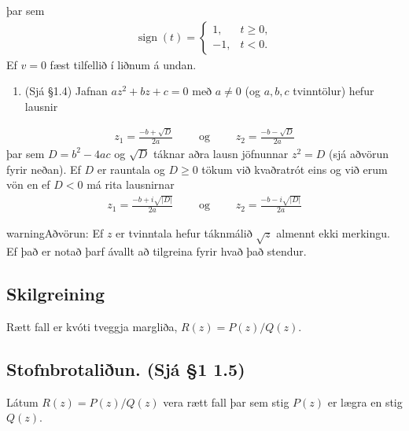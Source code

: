 \documentclass[a4paper,10pt,icelandic]{sphinxmanual}
\begin{document}
þar sem
\begin{equation*}
\begin{split}{{\operatorname{sign}}}(t)=
 \begin{cases}
 1, &t\geq 0,\\
 -1,&t<0.
 \end{cases}\end{split}
\end{equation*}
Ef \(v=0\) fæst tilfellið í liðnum á undan.
\begin{enumerate}
%
\setcounter{enumi}{3}
\item {} 
(Sjá \S{}1.4)  Jafnan \(az^2+bz+c=0\) með \(a\neq 0\) (og \(a, b, c\) tvinntölur) hefur lausnir

\end{enumerate}
\begin{equation*}
\begin{split}z_1=\frac{-b+\sqrt{D}}{2a}\qquad\mbox{ og }\qquad z_2=\frac{-b-\sqrt{D}}{2a}\end{split}
\end{equation*}
þar sem \(D=b^2-4ac\) og \(\sqrt{D}\) táknar aðra lausn jöfnunnar \(z^2=D\) (sjá aðvörun fyrir neðan). Ef \(D\) er rauntala og \(D\geq 0\) tökum við kvaðratrót eins og við erum vön en ef \(D<0\) má rita lausnirnar
\begin{equation*}
\begin{split}z_1=\frac{-b+i\sqrt{|D|}}{2a}\qquad\mbox{ og }\qquad z_2=\frac{-b-i\sqrt{|D|}}{2a}\end{split}
\end{equation*}
\begin{sphinxadmonition}{warning}{Aðvörun:}
Ef \(z\) er tvinntala hefur táknmálið \(\sqrt{z}\) almennt ekki merkingu. Ef það er notað þarf ávallt að tilgreina fyrir hvað það stendur.
\end{sphinxadmonition}


\subsection{Skilgreining}
\label{\detokenize{Kafli01:id10}}
Rætt fall er kvóti tveggja margliða, \(R(z)=P(z)/Q(z)\).


\subsection{Stofnbrotaliðun. (Sjá \S{}1 1.5)}
\label{\detokenize{Kafli01:stofnbrotaliun-sja-1-1-5}}
Látum \(R(z)=P(z)/Q(z)\) vera rætt fall þar sem stig \(P(z)\) er lægra en stig \(Q(z)\).
\end{document}
